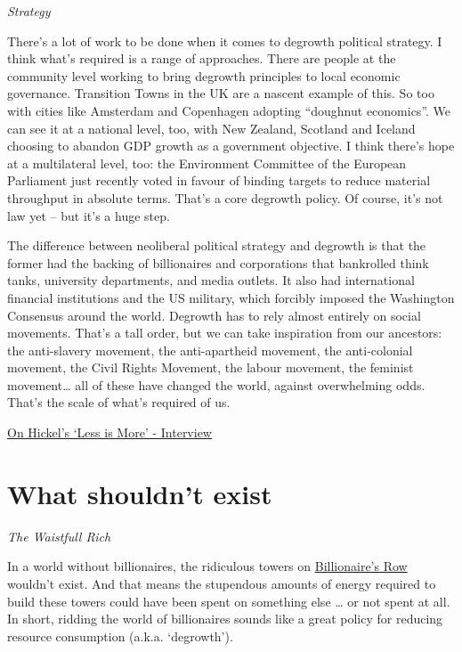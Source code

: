 \documentclass[
]{book}
\begin{document}
\emph{Strategy}

There's a lot of work to be done when it comes to degrowth political strategy. I think what's required is a range of approaches. There are people at the community level working to bring degrowth principles to local economic governance. Transition Towns in the UK are a nascent example of this. So too with cities like Amsterdam and Copenhagen adopting ``doughnut economics''. We can see it at a national level, too, with New Zealand, Scotland and Iceland choosing to abandon GDP growth as a government objective. I think there's hope at a multilateral level, too: the Environment Committee of the European Parliament just recently voted in favour of binding targets to reduce material throughput in absolute terms. That's a core degrowth policy. Of course, it's not law yet -- but it's a huge step.

The difference between neoliberal political strategy and degrowth is that the former had the backing of billionaires and corporations that bankrolled think tanks, university departments, and media outlets. It also had international financial institutions and the US military, which forcibly imposed the Washington Consensus around the world. Degrowth has to rely almost entirely on social movements. That's a tall order, but we can take inspiration from our ancestors: the anti-slavery movement, the anti-apartheid movement, the anti-colonial movement, the Civil Rights Movement, the labour movement, the feminist movement\ldots{} all of these have changed the world, against overwhelming odds. That's the scale of what's required of us.

\href{https://www.the-trouble.com/content/2021/2/11/ecosocialism-is-the-horizon-degrowth-is-the-way}{On Hickel's `Less is More' - Interview}

\hypertarget{what-shouldnt-exist}{%
\section{What shouldn't exist}\label{what-shouldnt-exist}}

\emph{The Waistfull Rich}

In a world without billionaires, the ridiculous towers on
\href{https://dyrehaugen.github.io/rurb/high-rise-building.html}{Billionaire's Row} wouldn't exist.
And that means the stupendous amounts of energy required to build these towers
could have been spent on something else \ldots{} or not spent at all.
In short, ridding the world of billionaires sounds like a
great policy for reducing resource consumption (a.k.a. `degrowth').
\end{document}
